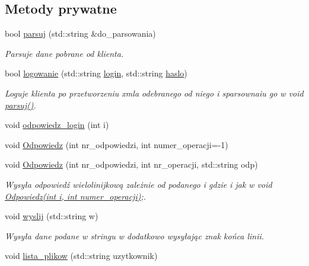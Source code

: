 \subsection*{Metody prywatne}
\begin{CompactItemize}
\item 
bool \hyperlink{a00005_9ce7290217bd14e4efcbe2cad32ccf95}{parsuj} (std::string \&do\_\-parsowania)
\begin{CompactList}\small\item\em Parsuje dane pobrane od klienta. \item\end{CompactList}\item 
bool \hyperlink{a00005_71abf468eb72a833dbd6c8a895b66b52}{logowanie} (std::string \hyperlink{a00005_8bb124a2f285074773d1b0ee62cf0cc0}{login}, std::string \hyperlink{a00005_2fc04d16e2ba688c5b306a2ad6770039}{haslo})
\begin{CompactList}\small\item\em Loguje klienta po przetworzeniu xmla odebranego od niego i sparsownaiu go w void \hyperlink{a00005_9ce7290217bd14e4efcbe2cad32ccf95}{parsuj()}. \item\end{CompactList}\item 
void \hyperlink{a00005_6a29174f787861caadc6c2e34b99f8c0}{odpowiedz\_\-login} (int i)
\item 
void \hyperlink{a00005_49d270636d2f3d5376c3cba62b5ea839}{Odpowiedz} (int nr\_\-odpowiedzi, int numer\_\-operacji=-1)
\item 
void \hyperlink{a00005_e45404aec82f8c70a023bdc365c74287}{Odpowiedz} (int nr\_\-odpowiedzi, int nr\_\-operacji, std::string odp)
\begin{CompactList}\small\item\em Wysyła odpowiedź wielolinijkową zależnie od podanego i gdzie i jak w void \hyperlink{a00005_49d270636d2f3d5376c3cba62b5ea839}{Odpowiedz(int i, int numer\_\-operacji)};. \item\end{CompactList}\item 
void \hyperlink{a00005_2f6aceaa94a28fc699e4f824f7622b51}{wyslij} (std::string w)
\begin{CompactList}\small\item\em Wysyła dane podane w stringu w dodatkowo wysyłając znak końca linii. \item\end{CompactList}\item 
void \hyperlink{a00005_96f941201d172eeaf2fb4d8429edfc0c}{lista\_\-plikow} (std::string uzytkownik)

\end{CompactItemize}
